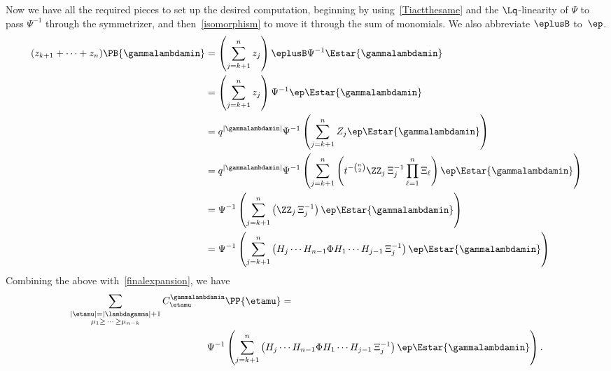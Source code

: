 Now we have all the required pieces to set up the desired computation, beginning by using~\eqref{Tiactthesame} and the $\Lq$-linearity of $\Psi$ to pass $\Psi^{-1}$ through the symmetrizer, and then~\eqref{isomorphism} to move it through the sum of monomials. We also abbreviate $\eplusB$ to~$\ep$.
\begin{align*}
    (z_{k+1} + \dots + z_n) \PB{\gammalambdamin} &=  \left(\sum_{j=k+1}^n z_j \right) \eplusB \Psi^{-1} \Estar{\gammalambdamin}\\
     &=  \left(\sum_{j=k+1}^n z_j \right) \Psi^{-1} \ep \Estar{\gammalambdamin}\\
    &= q^{|\gammalambdamin|} \Psi^{-1} \left( \sum_{j=k+1}^n Z_j \ep \Estar{\gammalambdamin}\right)\\
    &= q^{|\gammalambdamin|}\Psi^{-1}  \left( \sum_{j=k+1}^n \left( t^{-\binom{n}{2}} \ZZ_j\, \Xi_j^{-1} \prod_{\ell=1}^n \Xi_\ell \right) \ep \Estar{\gammalambdamin}\right)\\
    &= \Psi^{-1} \left( \sum_{j=k+1}^n \left( \ZZ_j\, \Xi_j^{-1} \right) \ep \Estar{\gammalambdamin}\right)\\
    &= \Psi^{-1} \left( \sum_{j=k+1}^n \left( H_j \dotsm H_{n-1} \Phi H_1 \dotsm H_{j-1} \, \Xi_j^{-1} \right) \ep \Estar{\gammalambdamin}\right)   \end{align*}
Combining the above with~\eqref{finalexpansion}, we have
\begin{align*} \sum_{\substack{|\etamu| = |\lambdagamma| + 1 \\ \mu_1 \geq \, \dotsm \, \geq \mu_{n-k}}}  C^{\gammalambdamin}_{\etamu} &\PP{\etamu} = \\ \Psi^{-1} &\left( \sum_{j=k+1}^n \left( H_j \dotsm H_{n-1} \Phi H_1 \dotsm H_{j-1} \, \Xi_j^{-1} \right) \ep \Estar{\gammalambdamin}\right). \end{align*}


